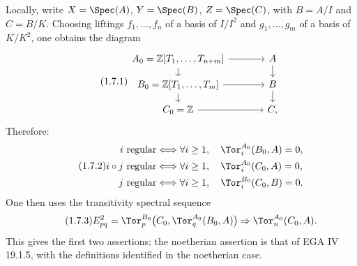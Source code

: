Locally, write \(X=\Spec(A)\), \(Y=\Spec(B)\), \(Z=\Spec(C)\), with \(B=A/I\) and \(C=B/K\). Choosing liftings \(f_1,\ldots,f_n\) of a basis of \(I/I^2\) and \(g_1,\ldots,g_m\) of a basis of \(K/K^2\), one obtains the diagram
\begin{equation}\tag{1.7.1}
\begin{tikzcd}[column sep=large,row sep=small]
A_0=\mathbb Z[T_1,\ldots,T_{n+m}] \arrow[r] \arrow[d] & A \arrow[d]\\
B_0=\mathbb Z[T_1,\ldots,T_m] \arrow[r] \arrow[d] & B \arrow[d]\\
C_0=\mathbb Z \arrow[r] & C,
\end{tikzcd}
\end{equation}
Therefore:
\begin{equation}\tag{1.7.2}
\begin{aligned}
 i\ \text{regular} &\Longleftrightarrow \forall i\ge1,\quad
 \Tor_i^{A_0}(B_0,A)=0,\\
 i\circ j\ \text{regular} &\Longleftrightarrow \forall i\ge1,\quad
 \Tor_i^{A_0}(C_0,A)=0,\\
 j\ \text{regular} &\Longleftrightarrow \forall i\ge1,\quad
 \Tor_i^{B_0}(C_0,B)=0.
\end{aligned}
\end{equation}
One then uses the transitivity spectral sequence
\begin{equation}\tag{1.7.3}
E^2_{pq}=\Tor_p^{B_0}\bigl(C_0,\Tor_q^{A_0}(B_0,A)\bigr)\Rightarrow\Tor_n^{A_0}(C_0,A).
\end{equation}
This gives the first two assertions; the noetherian assertion is that of EGA IV 19.1.5, with the definitions identified in the noetherian case.


